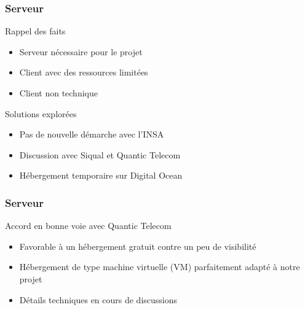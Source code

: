 \speaker{\Matthieu}

\begin{frame}
	\frametitle{Serveur}
	\begin{block}{Rappel des faits}
      \begin{itemize}
        \item Serveur nécessaire pour le projet
        \item Client avec des ressources limitées
        \item Client non technique
      \end{itemize}
     \end{block}

	\begin{block}{Solutions explorées}
      \begin{itemize}
        \item Pas de nouvelle démarche avec l'INSA
        \item Discussion avec Siqual et Quantic Telecom
        \item Hébergement temporaire sur Digital Ocean
      \end{itemize}
     \end{block}
\end{frame}

\begin{frame}
	\frametitle{Serveur}


	
    \begin{block}{Accord en bonne voie avec Quantic Telecom}
	  \begin{itemize}
		\item Favorable à un hébergement gratuit contre un peu de visibilité
		\item Hébergement de type machine virtuelle (VM) parfaitement adapté à notre projet
		\item Détails techniques en cours de discussions
	  \end{itemize}
	\end{block}
\end{frame}

